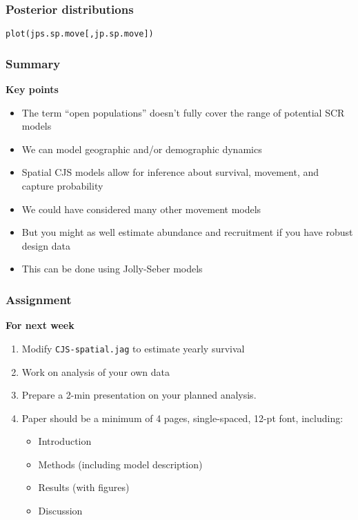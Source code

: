 \documentclass[color=usenames,dvipsnames]{beamer}\usepackage[]{graphicx}\usepackage[]{color}
\makeatletter
\newcommand{\hlstd}[1]{\textcolor[rgb]{0,0,0}{#1}}%
\newcommand{\hlkwd}[1]{\textcolor[rgb]{0.004,0.004,0.506}{#1}}%
\newenvironment{kframe}{%
 \def\at@end@of@kframe{}%
 \ifinner\ifhmode%
  \def\at@end@of@kframe{\end{minipage}}%
  \begin{minipage}{\columnwidth}%
 \fi\fi%
 \def\FrameCommand##1{\hskip\@totalleftmargin \hskip-\fboxsep
 \colorbox{shadecolor}{##1}\hskip-\fboxsep
     \hskip-\linewidth \hskip-\@totalleftmargin \hskip\columnwidth}%
 \MakeFramed {\advance\hsize-\width
   \@totalleftmargin\z@ \linewidth\hsize
   \@setminipage}}%
 {\par\unskip\endMakeFramed%
 \at@end@of@kframe}
\newenvironment{knitrout}{}{} %
\makeatother
\begin{document}
\begin{frame}[fragile]
  \frametitle{Posterior distributions}
\begin{knitrout}
\color{fgcolor}\begin{kframe}
\begin{alltt}
\hlkwd{plot}\hlstd{(jps.sp.move[,jp.sp.move])}
\end{alltt}


{\ttfamily\noindent\bfseries\color{errorcolor}{\#\# Error in plot(jps.sp.move[, jp.sp.move]): object 'jps.sp.move' not found}}\end{kframe}
\end{knitrout}
\end{frame}






\begin{frame}
  \frametitle{Summary}
  \large
  {\bf Key points}
  \begin{itemize}[<+->]
    \item The term ``open populations'' doesn't fully cover the range
      of potential SCR models
    \item We can model geographic and/or demographic dynamics
    \item Spatial CJS models allow for inference about survival,
      movement, and capture probability
    \item We could have considered many other movement models
    \item But you might as well estimate abundance and recruitment if
      you have robust design data
    \item This can be done using Jolly-Seber models
  \end{itemize}
\end{frame}



\begin{frame}
  \frametitle{Assignment}
  {\bf \large For next week}
  \begin{enumerate}[\bf (1)]
    \item Modify {\tt CJS-spatial.jag} to estimate yearly survival
    \item Work on analysis of your own data
    \item Prepare a 2-min presentation on your planned analysis.
    \item Paper should be a minimum of 4 pages, single-spaced, 12-pt
      font, including:
      \begin{itemize}
        \item Introduction
        \item Methods (including model description)
        \item Results (with figures)
        \item Discussion
      \end{itemize}
  \end{enumerate}
\end{frame}
\end{document}
